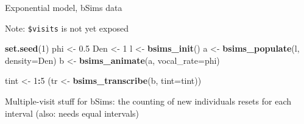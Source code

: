 \documentclass[12pt,]{book}
\newenvironment{Shaded}{\begin{snugshade}}{\end{snugshade}}
\newcommand{\DataTypeTok}[1]{\textcolor[rgb]{0.13,0.29,0.53}{#1}}
\newcommand{\DecValTok}[1]{\textcolor[rgb]{0.00,0.00,0.81}{#1}}
\newcommand{\FloatTok}[1]{\textcolor[rgb]{0.00,0.00,0.81}{#1}}
\newcommand{\KeywordTok}[1]{\textcolor[rgb]{0.13,0.29,0.53}{\textbf{#1}}}
\newcommand{\NormalTok}[1]{#1}
\newcommand{\OperatorTok}[1]{\textcolor[rgb]{0.81,0.36,0.00}{\textbf{#1}}}
\newcommand{\StringTok}[1]{\textcolor[rgb]{0.31,0.60,0.02}{#1}}
\begin{document}
Exponential model, bSims data

Note: \texttt{\$visits} is not yet exposed

\begin{Shaded}
\begin{Highlighting}[]
\KeywordTok{set.seed}\NormalTok{(}\DecValTok{1}\NormalTok{)}
\NormalTok{phi <-}\StringTok{ }\FloatTok{0.5}
\NormalTok{Den <-}\StringTok{ }\DecValTok{1}
\NormalTok{l <-}\StringTok{ }\KeywordTok{bsims_init}\NormalTok{()}
\NormalTok{a <-}\StringTok{ }\KeywordTok{bsims_populate}\NormalTok{(l, }\DataTypeTok{density=}\NormalTok{Den)}
\NormalTok{b <-}\StringTok{ }\KeywordTok{bsims_animate}\NormalTok{(a, }\DataTypeTok{vocal_rate=}\NormalTok{phi)}

\NormalTok{tint <-}\StringTok{ }\DecValTok{1}\OperatorTok{:}\DecValTok{5}
\NormalTok{(tr <-}\StringTok{ }\KeywordTok{bsims_transcribe}\NormalTok{(b, }\DataTypeTok{tint=}\NormalTok{tint))}
\end{Highlighting}
\end{Shaded}

Multiple-visit stuff for bSims: the counting of new individuals
resets for each interval (also: needs equal intervals)
\end{document}
